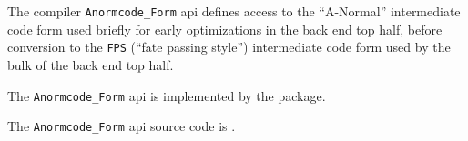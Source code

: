 
The compiler {\tt Anormcode\_Form} api defines access to the ``A-Normal'' intermediate code form 
used briefly for early optimizations in the back end top half, before conversion to the 
{\tt FPS} (``fate passing style'') intermediate code form used by the bulk of 
the back end top half.

The {\tt Anormcode\_Form} api is implemented by the  package.

The {\tt Anormcode\_Form} api source code is .





